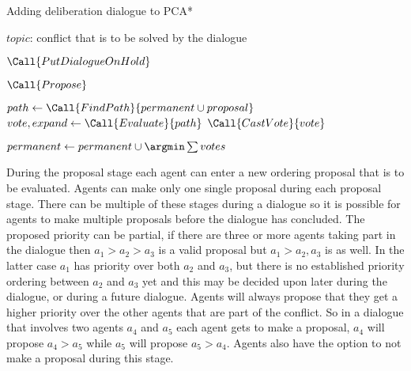 \begin{algorithm}[t]
    \caption{Adding deliberation dialogue to PCA*}
    \label{alg:dpca}
    \begin{algorithmic}[1]
        \Require $topic$: conflict that is to be solved by the dialogue
        
        
        \State $\Call{PutDialogueOnHold}$
        \EndIf
        
        
        \Repeat
        \State $\Call{Propose}$
        
        
        \State $path \gets \Call{FindPath}{permanent \cup proposal}$
        \State $vote, expand \gets \Call{Evaluate}{path}$
        \State $\Call{CastVote}{vote}$
        \EndFor
        
        
        \State $permanent \gets permanent \cup {\argmin \sum votes}$
    \end{algorithmic}
\end{algorithm}

During the proposal stage each agent can enter a new ordering proposal that is
to be evaluated. Agents can make only one single proposal during each proposal
stage. There can be multiple of these stages during a dialogue so it is
possible for agents to make multiple proposals before the dialogue has
concluded. The proposed priority can be
partial, if there are three or more agents taking part in the dialogue then
$a_1 > a_2 > a_3$ is a valid proposal but $a_1 > a_2, a_3$ is as well. In the
latter case $a_1$ has priority over both $a_2$ and $a_3$, but there is no
established priority ordering between $a_2$ and $a_3$ yet and this may be
decided upon later during the dialogue, or during a future dialogue. Agents
will always propose that they get a higher priority over the other agents that
are part of the conflict. So in a dialogue that involves two agents $a_4$ and
$a_5$ each agent gets to make a proposal, $a_4$ will propose $a_4 > a_5$ while
$a_5$ will propose $a_5 > a_4$. Agents also have the option to not make a 
proposal during this stage.

